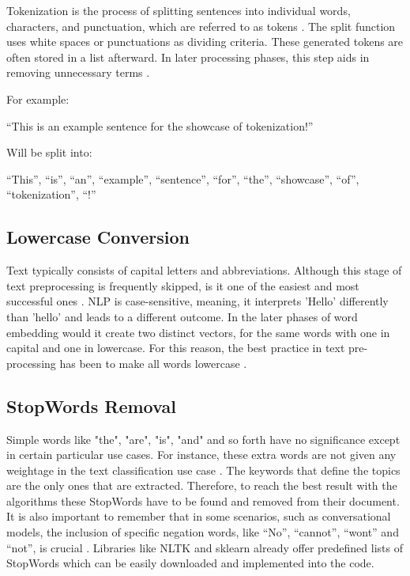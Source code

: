 Tokenization is the process of splitting sentences into individual words, characters, and punctuation, which are referred to as tokens \citep{tabassum_survey_2020}. The split function uses white spaces or punctuations as dividing criteria. These generated tokens are often stored in a list afterward. In later processing phases, this step aids in removing unnecessary terms \citep{tabassum_survey_2020}. 

For example:

“This is an example sentence for the showcase of tokenization!”

Will be split into:

“This”, “is”, “an”, “example”, “sentence”, “for”, “the”, “showcase”, “of”, “tokenization”, “!”

\subsection{Lowercase Conversion}

Text typically consists of capital letters and abbreviations. Although this stage of text preprocessing is frequently skipped, is it one of the easiest and most successful ones \citep{tabassum_survey_2020}. NLP is case-sensitive, meaning, it interprets 'Hello' differently than 'hello' and leads to a different outcome. In the later phases of word embedding would it create two distinct vectors, for the same words with one in capital and one in lowercase. For this reason, the best practice in text pre-processing has been to make all words lowercase \citep{tabassum_survey_2020}.

\subsection{StopWords Removal}

Simple words like "the", "are", "is", "and" and so forth have no significance except in certain particular use cases. For instance, these extra words are not given any weightage in the text classification use case \citep{tabassum_survey_2020}. The keywords that define the topics are the only ones that are extracted. Therefore, to reach the best result with the algorithms these StopWords have to be found and removed from their document. It is also important to remember that in some scenarios, such as conversational models, the inclusion of specific negation words, like “No”, “cannot”, “wont” and “not”, is crucial \citep{tabassum_survey_2020}. Libraries like NLTK and sklearn already offer predefined lists of StopWords which can be easily downloaded and implemented into the code.

